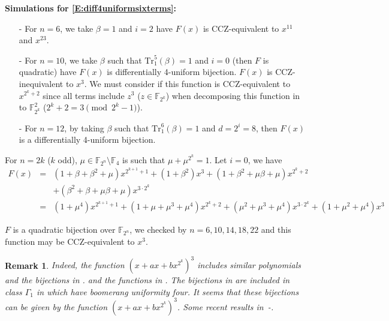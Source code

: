 \documentclass[8pt,oneside]{article}
\newcommand{\0}{\textbf{0}}
\newcommand{\1}{\textbf{1}}
\newcommand{\F}{\mathbb{F}}
\newtheorem{remark}{Remark}
\begin{document}
    \textbf{Simulations for \eqref{E:diff4uniformsixterms}:}
    \begin{enumerate}
      \item [-] For $n=6$, we take $\beta=1$ and $i=2$ have $F(x)$ is CCZ-equivalent to $x^{11}$ and $x^{23}$.
      \item [-] For $n=10$, we take $\beta$ such that $\mathrm{Tr}_1^5(\beta)=1$ and $i=0$ (then $F$ is quadratic) have $F(x)$ is
    differentially 4-uniform bijection. $F(x)$ is CCZ-inequivalent to $x^{3}$.
    {\color{red}We must consider if this function is CCZ-equivalent to $x^{2^k+2}$ since all terms include $z^3$ ($z\in\F_{2^k}$) when decomposing this
    function in to $\F_{2^k}^2$ ($2^k+2=3 \pmod {2^k-1}$).}
      \item [-] For $n=12$, by taking $\beta$ such that $\mathrm{Tr}_1^6(\beta)=1$ and $d=2^i=8$, then $F(x)$ is a differentially 4-uniform bijection.
    \end{enumerate}
    
    \vspace{5mm}
    
    For $n=2k$ ($k$ odd), $\mu\in\F_{2^n}\setminus \F_4$ is such that $\mu+\mu^{2^k}=1$.
    Let $i=0$, we have
    \begin{eqnarray}\label{E:diff4uniformQuadratic}
    F(x)&=&(1+\beta+\beta^2+\mu) x^{2^{k+1}+1}+(1+\beta^2) x^{3}+(1+\beta^2+\mu\beta+\mu) x^{2^k+2}\nonumber\\
    &&+(\beta^2+\beta+\mu\beta+\mu) x^{3\cdot 2^k}\nonumber\\
    &=&(1+\mu^4) x^{2^{k+1}+1}+(1+\mu+\mu^3+\mu^4) x^{2^k+2}+(\mu^2+\mu^3+\mu^4) x^{3\cdot 2^k}+(1+\mu^2+\mu^4) x^3\nonumber
    \end{eqnarray}
    
    $F$ is a quadratic bijection over $\F_{2^n}$, we checked by $n=6,10,14,18,22$ and this function may be CCZ-equivalent to $x^{3}$.
    \begin{remark}\label{R:TuPermutation}
    {\color{red}Indeed, the function $(x+ax+bx^{2^k})^3$ includes similar polynomials and the bijections in \cite{TuFFA19,TuFFA18}. and the functions in \cite{TuBCTIT20}.
    The bijections in \cite[Theorem 1-(2)]{TuFFA18} are included in class $\Gamma_1$ in \cite{TuBCTIT20} which have boomerang uniformity four.
    It seems that these bijections can be given by the function $(x+ax+bx^{2^k})^3$.
    Some recent results in~\cite{QuButterflyDCC21,KimTypeCCDS21}-\cite{NoteButterflyDCC2022}.
    }
    \end{remark}
\end{document}
